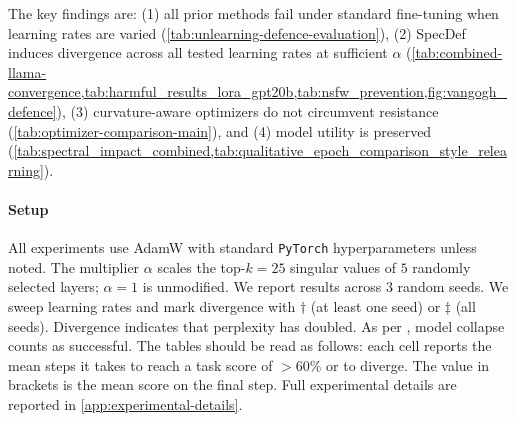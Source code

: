 \documentclass{article}
\theoremstyle{plain}
\theoremstyle{definition}
\theoremstyle{remark}
\begin{document}
The key findings are: (1) all prior methods fail under standard fine-tuning when learning rates are varied (\cref{tab:unlearning-defence-evaluation}), (2) SpecDef induces divergence across all tested learning rates at sufficient $\alpha$ (\cref{tab:combined-llama-convergence,tab:harmful_results_lora_gpt20b,tab:nsfw_prevention,fig:vangogh_defence}), (3) curvature-aware optimizers do not circumvent resistance (\cref{tab:optimizer-comparison-main}), and (4) model utility is preserved (\cref{tab:spectral_impact_combined,tab:qualitative_epoch_comparison_style_relearning}).

\begin{table}[htbp!]
\centering
\caption{SpecDef preserves model utility. Performance differences are negligible across benchmarks even at extreme multipliers.}
\label{tab:spectral_impact_combined}
\end{table}

\paragraph{Setup} All experiments use AdamW with standard \texttt{PyTorch} hyperparameters unless noted. The multiplier $\alpha$ scales the top-$k{=}25$ singular values of $5$ randomly selected layers; $\alpha{=}1$ is unmodified. We report results across 3 random seeds. We sweep learning rates and mark divergence with $\dagger$ (at least one seed) or $\ddagger$ (all seeds). Divergence indicates that perplexity has doubled. As per \citet{henderson2023self}, model collapse counts as successful. The tables should be read as follows: each cell reports the mean steps it takes to reach a task score of $>60\%$ or to diverge. The value in brackets is the mean score on the final step. Full experimental details are reported in \cref{app:experimental-details}.
\end{document}
